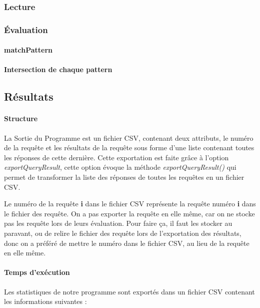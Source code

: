 \documentclass[12pt,titlepage]{article}
\begin{document}
\subsubsection{Lecture}

\subsubsection{Évaluation}

\paragraph{matchPattern}

\paragraph{Intersection de chaque pattern}

\subsection{Résultats}

\paragraph{Structure}

La Sortie du Programme est un fichier CSV, contenant deux attributs, le numéro de la requête
et les résultats de la requête sous forme d'une liste contenant toutes les réponses de cette dernière.
Cette exportation est faite grâce à l'option \textit{exportQueryResult}, cette option évoque la méthode \textit{exportQueryResult()} qui permet de transformer la liste des réponses de toutes les requêtes en un fichier CSV.

Le numéro de la requête \textbf{i} dans le fichier CSV représente la requête numéro \textbf{i} dans le fichier des requête. On a pas exporter la requête en elle même, car on ne stocke pas les requête lors de leurs évaluation. Pour faire ça, il faut les stocker au paravant, ou de relire le fichier des requête lors de l'exportation des résultats, donc on a préféré de mettre le numéro dans le fichier CSV, au lieu de la requête en elle même.  

\paragraph{Temps d'exécution}
Les statistiques de notre programme sont exportés dans un fichier CSV contenant les informations suivantes : 
\end{document}
